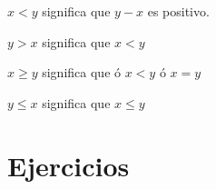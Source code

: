 \begin{def.}
$x<y $ significa que $y-x$ es positivo. \\
\end{def.}
\begin{def.}
$y>x$ significa que $x<y$\\
\end{def.}
\begin{def.}
$x \geq y$ significa que ó $x<y$ ó $x=y$\\
\end{def.}
\begin{def.}
$y \leq x$ significa que $x \leq y$ 
\end{def.}

\section{Ejercicios}
